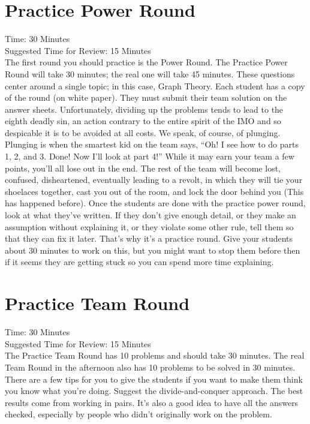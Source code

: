 \documentclass[11pt]{article}
\begin{document}
\begin{small}
\section{Practice Power Round}
\noindent Time: 30 Minutes \\
\noindent Suggested Time for Review: 15 Minutes\\
\noindent The first round you should practice is the Power Round. The Practice Power Round will take 30 minutes; the real one will take 45 minutes. These questions center around a single topic; in this case, Graph Theory.  Each student has a copy of the round (on white paper).  They must submit their team solution on the answer sheets. Unfortunately, dividing up the problems tends to lead to the eighth deadly sin, an action contrary to the entire spirit of the IMO and so despicable it is to be avoided at all costs. We speak, of course, of plunging. Plunging is when the smartest kid on the team says, ``Oh! I see how to do parts 1, 2, and 3. Done! Now I'll look at part 4!'' While it may earn your team a few points, you'll all lose out in the end. The rest of the team will become lost, confused, disheartened, eventually leading to a revolt, in which they will tie your shoelaces together, cast you out of the room, and lock the door behind you (This has happened before). Once the students are done with the practice power round, look at what they've written. If they don't give enough detail, or they make an assumption without explaining it, or they violate some other rule, tell them so that they can fix it later. That's why it's a practice round. Give your students about 30 minutes to work on this, but you might want to stop them before then if it seems they are getting stuck so you can spend more time explaining.

\section{Practice Team Round}
\noindent Time: 30 Minutes \\
\noindent Suggested Time for Review: 15 Minutes\\
\noindent The Practice Team Round has 10 problems and should take 30 minutes. The real Team Round in the afternoon also has 10 problems to be solved in 30 minutes.  There are a few tips for you to give the students if you want to make them think you know what you're doing. Suggest the divide-and-conquer approach. The best results come from working in pairs. It's also a good idea to have all the answers checked, especially by people who didn't originally work on the problem.


\end{small}
\end{document}
